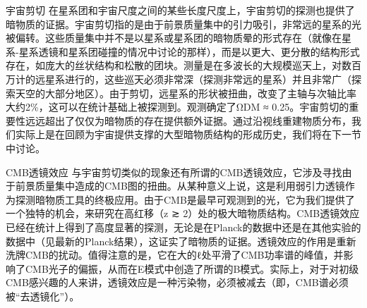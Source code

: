 宇宙剪切
在星系团和宇宙尺度之间的某些长度尺度上，宇宙剪切的探测也提供了暗物质的证据。宇宙剪切指的是由于前景质量集中的引力吸引，非常远的星系的光被偏转。这些质量集中并不是以星系或星系团的暗物质晕的形式存在（就像在星系-星系透镜和星系团碰撞的情况中讨论的那样），而是以更大、更分散的结构形式存在，如庞大的丝状结构和松散的团块。测量是在多波长的大规模巡天上，对数百万计的远星系进行的，这些巡天必须非常深（探测非常远的星系）并且非常广（探索天空的大部分地区）。由于剪切，远星系的形状被扭曲，改变了主轴与次轴比率大约2\%，这可以在统计基础上被探测到。观测确定了ΩDM ≈ 0.25。宇宙剪切的重要性远远超出了仅仅为暗物质的存在提供额外证据。通过沿视线重建物质分布，我们实际上是在回顾为宇宙提供支撑的大型暗物质结构的形成历史，我们将在下一节中讨论。

CMB透镜效应
与宇宙剪切类似的现象还有所谓的CMB透镜效应，它涉及寻找由于前景质量集中造成的CMB图的扭曲。从某种意义上说，这是利用弱引力透镜作为探测暗物质工具的终极应用。由于CMB是最早可观测到的光，它为我们提供了一个独特的机会，来研究在高红移（z ≳ 2）处的极大暗物质结构。CMB透镜效应已经在统计上得到了高度显著的探测，无论是在Planck的数据中还是在其他实验的数据中（见最新的Planck结果），这证实了暗物质的证据。透镜效应的作用是重新洗牌CMB的扰动。值得注意的是，它在大的ℓ处平滑了CMB功率谱的峰值，并影响了CMB光子的偏振，从而在E模式中创造了所谓的B模式。实际上，对于对初级CMB感兴趣的人来讲，透镜效应是一种污染物，必须被减去（即，CMB谱必须被“去透镜化”）。

